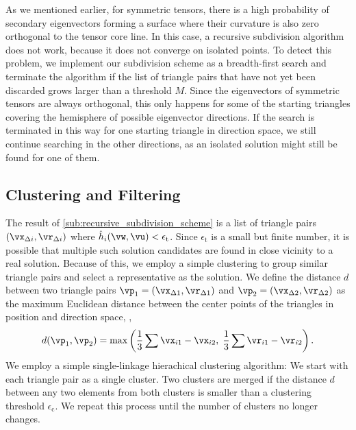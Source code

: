 %
As we mentioned earlier,  for symmetric
tensors, there is a high probability of secondary eigenvectors forming a
surface where their curvature is also zero orthogonal to the tensor core line.
%
In this case, a recursive subdivision algorithm does not work, because it does
not converge on isolated points.
%
To detect this problem, we implement our subdivision scheme as a breadth-first
search and terminate the algorithm if the list of triangle pairs that have
not yet been discarded grows larger than a threshold $M$.
%
Since the eigenvectors of symmetric tensors are always orthogonal, this only
happens for some of the starting triangles covering the hemisphere of possible
eigenvector directions.
%
If the search is terminated in this way for one starting triangle in direction
space, we still continue searching in the other directions, as an isolated
solution might still be found for one of them.
%
%

\subsection{Clustering and Filtering} %
\label{sub:clustering_and_filtering}
% 
The result of \cref{sub:recursive_subdivision_scheme} is a list of triangle
pairs $(\vx_{\Delta i}, \vr_{\Delta i})$ where $\hat{h}_i(\vw, \vu) <
\epsilon_{\mathrm{t}}$.
%
Since $\epsilon_{\mathrm{t}}$ is a small but finite number, it is possible that
multiple such solution candidates are found in close vicinity to a real solution.
%
Because of this, we employ a simple clustering to group similar triangle pairs
and select a representative as the solution.
%
We define the distance $d$ between two triangle pairs $\vp_1 = (\vx_{\Delta 1},
\vr_{\Delta 1})$ and $\vp_2 = (\vx_{\Delta 2}, \vr_{\Delta 2})$ as the
maximum Euclidean distance between the center points of the triangles in
position and direction space, \ie,
%
\begin{equation}
  d(\vp_1, \vp_2)
    = \max\left(\frac{1}{3}\sum \vx_{i1} - \vx_{i2},
      \; \frac{1}{3}\sum \vr_{i1} - \vr_{i2}\right) \text{.}
\end{equation}
%
We employ a simple single-linkage hierachical clustering algorithm:
%
We start with each triangle pair as a single cluster.
%
Two clusters are merged if the distance $d$ between any two elements from both
clusters is smaller than a clustering threshold $\epsilon_{\mathrm{c}}$.
%
We repeat this process until the number of clusters no longer changes.
%

